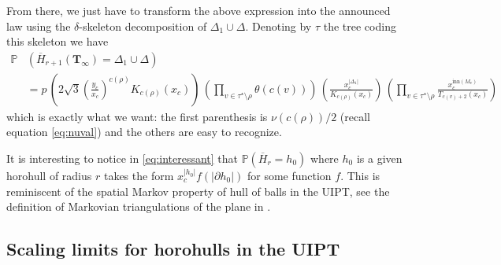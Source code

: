 \documentclass[AHL,XML,longabstracts,Unicode,NoSaveZebib]{cedram}
\begin{document}
From there, we just have to transform the above expression into the announced law using the $\delta$-skeleton decomposition of $\Delta_1 \cup \Delta$. Denoting by $\tau$ the tree coding this skeleton we have
\begin{align*}
\mathbb P &\left( \overline{H}_{r+1} (\mathbf T_\infty) = \Delta_1 \cup \Delta \right)\\
&  =
p \, \left(2\sqrt{3} \left(\frac{y_c}{x_c}\right)^{c(\rho)} K_{c(\rho)} (x_c)\right) \, \left(\prod_{v \in \tau^\star\setminus \rho} \theta(c(v))\right) \,
\left( \frac{x_c^{|\Delta_1|}}{K_{c(\rho)} (x_c)} \right)
\,
\left(\prod_{v \in \tau^\star\setminus \rho} \frac{x_c^{ \mathrm{inn}(M_v)}}{T_{c(v)+2}(x_c)} \right)
\end{align*}
which is exactly what we want: the first parenthesis is $\nu(c(\rho))/2$ (recall equation \eqref{eq:nuval}) and the others are easy to recognize.
\endproof
\begin{remark} It is interesting to notice in \eqref{eq:interessant} that $ \mathbb{P}( \overline{H}_{r} = h_{0})$ where $h_{0}$ is a given horohull of radius $r$ takes the form $x_{c}^{|h_{0}|} f(|\partial h_{0}|)$ for some function $f$. This is reminiscent of the spatial Markov property of hull of balls in the UIPT, see the definition of Markovian triangulations of the plane in \cite[Eq (1)]{CurPSHIT}.\end{remark}


\subsection{Scaling limits for horohulls in the UIPT}
\label{sec:scaling}
\end{document}
